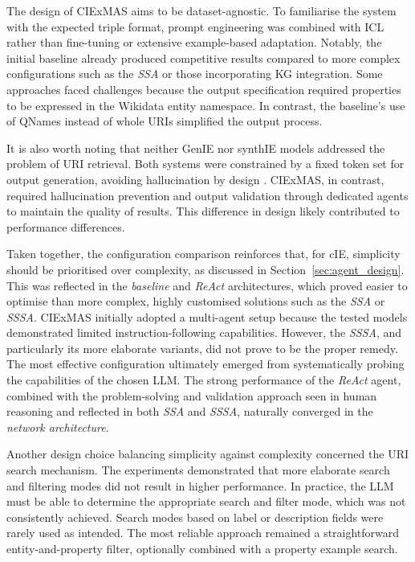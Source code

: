 \documentclass[a4paper,oneside,bibliography=totoc]{scrbook}
\begin{document}
The design of CIExMAS aims to be dataset-agnostic. To familiarise the system with the expected triple format, prompt engineering was combined with \ac{ICL} rather than fine-tuning or extensive example-based adaptation. Notably, the initial baseline already produced competitive results compared to more complex configurations such as the \textit{\ac{SSA}} or those incorporating \ac{KG} integration. Some approaches faced challenges because the output specification required properties to be expressed in the Wikidata entity namespace. In contrast, the baseline's use of QNames instead of whole \acp{URI} simplified the output process.

It is also worth noting that neither GenIE nor synthIE models addressed the problem of \ac{URI} retrieval. Both systems were constrained by a fixed token set for output generation, avoiding hallucination by design \cite{Josifoski2021,Josifoski2023}. CIExMAS, in contrast, required hallucination prevention and output validation through dedicated agents to maintain the quality of results. This difference in design likely contributed to performance differences.

Taken together, the configuration comparison reinforces that, for \ac{cIE}, simplicity should be prioritised over complexity, as discussed in Section~\ref{sec:agent_design}. This was reflected in the \textit{baseline} and \textit{\ac{ReAct}} architectures, which proved easier to optimise than more complex, highly customised solutions such as the \textit{\ac{SSA}} or \textit{\ac{SSSA}}. CIExMAS initially adopted a multi-agent setup because the tested models demonstrated limited instruction-following capabilities. However, the \textit{\ac{SSSA}}, and particularly its more elaborate variants, did not prove to be the proper remedy. The most effective configuration ultimately emerged from systematically probing the capabilities of the chosen \ac{LLM}. The strong performance of the \textit{\ac{ReAct}} agent, combined with the problem-solving and validation approach seen in human reasoning and reflected in both \textit{\ac{SSA}} and \textit{\ac{SSSA}}, naturally converged in the \textit{network architecture}.

Another design choice balancing simplicity against complexity concerned the \ac{URI} search mechanism. The experiments demonstrated that more elaborate search and filtering modes did not result in higher performance. In practice, the \ac{LLM} must be able to determine the appropriate search and filter mode, which was not consistently achieved. Search modes based on label or description fields were rarely used as intended. The most reliable approach remained a straightforward entity-and-property filter, optionally combined with a property example search.
\end{document}
